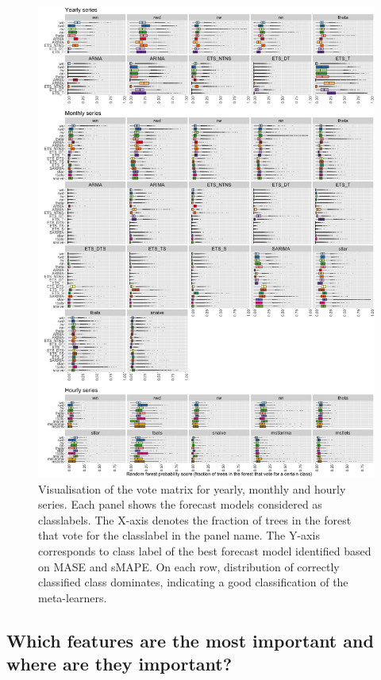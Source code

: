 \documentclass[11pt,a4paper,]{article}
\begin{document}
\begin{figure}[h]

{\centering \includegraphics[width=\textwidth]{figure/yearlyoob-1} 

}

\caption{Visualisation of the vote matrix for yearly, monthly and hourly series. Each panel shows the forecast models considered as classlabels. The X-axis denotes the fraction of trees in the forest that vote for the classlabel in the panel name. The Y-axis corresponds to class label of the best forecast model identified based on MASE and sMAPE. On each row, distribution of correctly classified class dominates, indicating a good classification of the meta-learners.}\label{fig:yearlyoob}
\end{figure}

\clearpage

\hypertarget{which-features-are-the-most-important-and-where-are-they-important}{%
\subsection{Which features are the most important and where are they important?}\label{which-features-are-the-most-important-and-where-are-they-important}}
\end{document}
